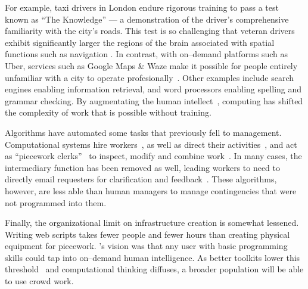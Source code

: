 \documentclass[trackingWork]{subfiles}
\begin{document}
For example, taxi drivers in London endure rigorous training to pass a test known as ``The Knowledge''
--- a demonstration of the driver's comprehensive familiarity with the city's roads.
This test is so challenging that veteran drivers exhibit significantly larger
the regions of the brain associated with spatial functions such as navigation
\cite{Maguire11042000,Maguire2894,Skok:1999:KML:299513.299625,
      skok2000managing,Woollett1407,woollett2011acquiring}.
In contrast, with on--demand platforms such as Uber, services such as Google Maps \& Waze make it possible for
people entirely unfamiliar with a city
to operate profesionally~\cite{silva2013traffic,hind2014outsmarting}.
Other examples include search engines enabling information retrieval, and word processors enabling spelling and grammar checking.
By augmentating the human intellect~\cite{engelbart2001augmenting}, computing has shifted the complexity of work that is possible without training.

Algorithms have automated some tasks that previously fell to management.
Computational systems hire workers~\cite{turkitLittle,weld2010decision}, as well as direct their activities~\cite{uberAlgorithm}, and act as ``piecework clerks''~\cite{10.2307/23702539} to inspect, modify and combine work~\cite{turkopticon,takingAHITMcInnis}.
In many cases, the intermediary function has been removed as well, leading workers to need to directly email requesters for clarification and feedback~\cite{martin2014being}.
These algorithms, however, are less able than human managers to manage contingencies that were not programmed into them.

Finally, the organizational limit on infrastructure creation is somewhat lessened. Writing web scripts takes fewer people and fewer hours than creating physical equipment for piecework.
\citeauthor{turkitLittle}'s vision was that any user with basic programming skills could tap into on--demand human intelligence.
As better toolkits lower this threshold~\cite{myers2000past} and computational thinking diffuses, a broader population will be able to use crowd work.
\end{document}
